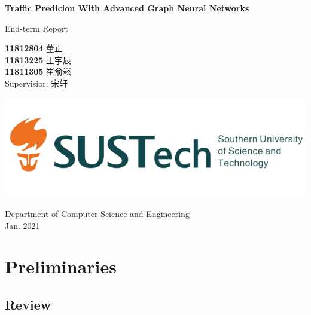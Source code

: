\documentclass[fontset=none]{ctexart}
\theoremstyle{definition}
\theoremstyle{remark}
\begin{document}
\begin{titlepage}
    \begin{center}
        \vspace*{1cm}
            
        \Huge
        \textbf{Traffic Predicion With Advanced Graph Neural Networks}
            
        \vspace{0.5cm}
        \LARGE
        End-term Report\\
            
        \vspace{1.5cm}
            
        \textbf{11812804}  董\quad 正\\
        \textbf{11813225}  王宇辰\\
        \textbf{11811305}  崔俞崧\\

        \vspace{0.5cm}
        Supervisior: 宋轩
            
        \vfill
            
        \includegraphics[width=\textwidth]{images/sustc.png}
            
        \vspace{0.2cm}
            
        \Large
        Department of Computer Science and Engineering\\
        \vspace{0.5cm}
        Jan. 2021
            
    \end{center}
\end{titlepage}

\tableofcontents

\clearpage
\section{Preliminaries}
\subsection{Review}
\end{document}
